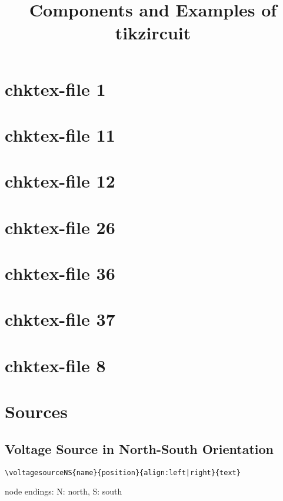 \documentclass[parskip=full]{scrartcl}
\title{Components and Examples of tikzircuit}
\begin{document}
\maketitle
\tableofcontents
\newpage


\section{chktex-file 1}

\section{chktex-file 11}

\section{chktex-file 12}

\section{chktex-file 26}

\section{chktex-file 36}

\section{chktex-file 37}

\section{chktex-file 8}

\section{Sources}

\subsection{Voltage Source in North-South Orientation}

\begin{verbatim}
\voltagesourceNS{name}{position}{align:left|right}{text}
\end{verbatim}
node endings: N: north, S: south
\end{document}
